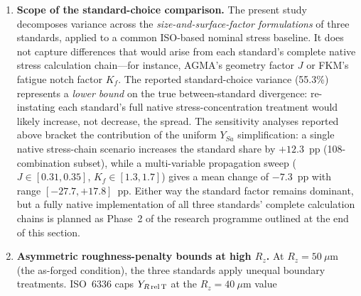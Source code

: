\documentclass[twocolumn,12pt,a4paper]{article}
\begin{document}
\begin{enumerate}
        This direction of change has a geometric explanation: for
        $z_1=20$, $m_n=3$~mm, $20^\circ$~PA, no profile shift, ISO's
        $Y_{Sa}=1.55$, AGMA's $1/J \approx 3.03$, and FKM's
        $K_f \approx 1.84$: the AGMA multiplier matches ISO to within
        $\sim$1\% ($(1/J)/(Y_{Fa}Y_\varepsilon) \approx 1.57$ vs.\
        $Y_{Sa}=1.55$), while the FKM multiplier is $\sim$19\% higher
        ($K_f/Y_{Sa} \approx 1.19$). The lower-bound interpretation is
        therefore strengthened for this gear: the midpoint native
        scenario raises the standard's share from 52.1\% to 64.4\%,
        while the propagation sweep brackets the effect between
        $-27.7$ and $+17.8$~pp. For other gear geometries (low tooth
        counts, high helix angles), this geometric coincidence may not
        hold, and a geometry-specific check is recommended.
  \item \textbf{Scope of the standard-choice comparison.} The present study
        decomposes variance across the \emph{size-and-surface-factor
        formulations} of three standards, applied to a common ISO-based
        nominal stress baseline. It does not capture differences that would
        arise from each standard's complete native stress calculation
        chain---for instance, AGMA's geometry factor $J$ or FKM's fatigue
        notch factor $K_f$. The reported standard-choice variance (55.3\%)
        represents a \emph{lower bound} on the true
        between-standard divergence: re-instating each standard's full native
        stress-concentration treatment would likely increase, not decrease,
        the spread. The sensitivity analyses reported above bracket the
        contribution of the uniform $Y_{Sa}$ simplification: a single
        native stress-chain scenario increases the standard share by
        $+12.3$~pp (108-combination subset), while a multi-variable
        propagation sweep ($J \in [0.31, 0.35]$, $K_f \in [1.3, 1.7]$)
        gives a mean change of $-7.3$~pp with range $[-27.7, +17.8]$~pp.
        Either way the standard factor remains dominant, but a
        fully native implementation of all three standards' complete
        calculation chains is planned as Phase~2 of the research programme
        outlined at the end of this section.
  \item \textbf{Asymmetric roughness-penalty bounds at high $R_z$.} At
        $R_z = 50~\mu$m (the as-forged condition), the three standards
        apply unequal boundary treatments. ISO~6336 caps
        $Y_{R\,\rm rel\,T}$ at the $R_z = 40~\mu$m value

\end{enumerate}
\end{document}
